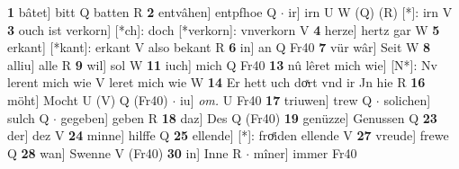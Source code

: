 \documentclass[8pt,a4paper,notitlepage]{article}
\begin{document}
\begin{table}[ht]
\begin{minipage}[t]{0.5\linewidth}
\textbf{1} bâtet] bitt Q batten R \textbf{2} entvâhen] entpfhoe Q  $\cdot$ ir] irn U W (Q) (R) [*]: irn  V \textbf{3} ouch ist verkorn] [*ch]: doch [*verkorn]: vnverkorn V \textbf{4} herze] hertz gar W \textbf{5} erkant] [*kant]: erkant V also bekant R \textbf{6} in] an Q Fr40 \textbf{7} vür wâr] Seit W \textbf{8} alliu] alle R \textbf{9} wil] sol W \textbf{11} iuch] mich Q Fr40 \textbf{13} nû lêret mich wie] [N*]: Nv lerent mich wie V leret mich wie W \textbf{14} Er hett uch doͯrt vnd ir Jn hie R \textbf{16} möht] Mocht U (V) Q (Fr40)  $\cdot$ iu] \textit{om.} U Fr40 \textbf{17} triuwen] trew Q  $\cdot$ solichen] sulch Q  $\cdot$ gegeben] geben R \textbf{18} daz] Des Q (Fr40) \textbf{19} genüzze] Genussen Q \textbf{23} der] dez V \textbf{24} minne] hilffe Q \textbf{25} ellende] [*]: froͤiden ellende V \textbf{27} vreude] frewe Q \textbf{28} wan] Swenne V (Fr40) \textbf{30} in] Inne R  $\cdot$ mîner] immer Fr40 \newline
\end{minipage}
\end{table}
\end{document}
